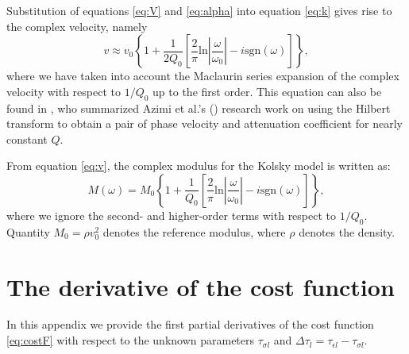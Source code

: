 \documentclass[article]{./macros/elsarticle_qh}
\begin{document}
Substitution of equations \ref{eq:V} and \ref{eq:alpha} into equation \ref{eq:k} gives rise to the complex velocity, namely
\begin{equation} \label{eq:v}
v \approx v_{0} \left \{
1 + \frac{1}{2Q_{0}} 
\left[
\frac{2}{\pi} \text{ln}\left| \frac{\omega}{\omega_{0}} \right|
- i \text{sgn}(\omega)
\right] 
\right \} ,
\end{equation}
where we have taken into account the Maclaurin series expansion of the complex velocity with respect to $1/Q_{0}$ up to the first order. This equation can also be found in \cite{aki.richards:1980}, who summarized Azimi et al.'s (\citeyear{azimi:1968}) research work on using the Hilbert transform to obtain a pair of phase velocity and attenuation coefficient for nearly constant $Q$.

From equation \ref{eq:v}, the complex modulus for the Kolsky model is written as:
\begin{equation}
M(\omega) = M_{0} \left \{
1 + \frac{1}{Q_{0}}  
\left[
\frac{2}{\pi} \text{ln} \left|\frac{\omega}{\omega_{0}}\right| - i \text{sgn}(\omega) \right]
\right \} ,
\end{equation}
where we ignore the second- and higher-order terms with respect to $1/Q_{0}$. Quantity $M_{0} = \rho v_{0}^2$ denotes the reference modulus, where $\rho$ denotes the density.

\section{The derivative of the cost function} 
In this appendix we provide the first partial derivatives of the cost function \ref{eq:costF} with respect to the unknown parameters $\tau_{\sigma l}$ and $\Delta \tau_{l} = \tau_{\epsilon l} - \tau_{\sigma l}$. 
\end{document}

